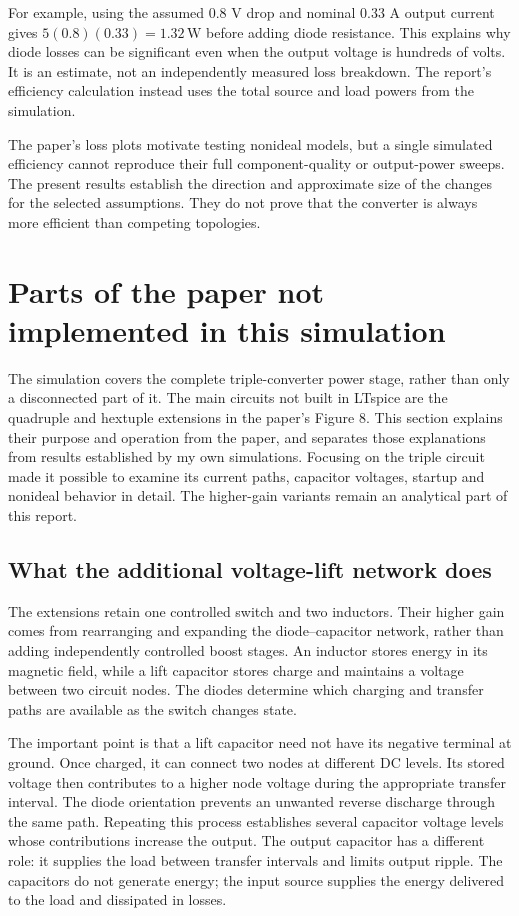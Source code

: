 \documentclass[11pt,a4paper]{article}
\newcommand{\unit}[1]{\,\mathrm{#1}}
\begin{document}
For example, using the assumed 0.8 V drop and nominal 0.33 A output current gives $5(0.8)(0.33)=1.32\unit{W}$ before adding diode resistance. This explains why diode losses can be significant even when the output voltage is hundreds of volts. It is an estimate, not an independently measured loss breakdown. The report's efficiency calculation instead uses the total source and load powers from the simulation.

The paper's loss plots motivate testing nonideal models, but a single simulated efficiency cannot reproduce their full component-quality or output-power sweeps. The present results establish the direction and approximate size of the changes for the selected assumptions. They do not prove that the converter is always more efficient than competing topologies.
\clearpage
\section{Parts of the paper not implemented in this simulation}
The simulation covers the complete triple-converter power stage, rather than only a disconnected part of it. The main circuits not built in LTspice are the quadruple and hextuple extensions in the paper's Figure 8. This section explains their purpose and operation from the paper, and separates those explanations from results established by my own simulations. Focusing on the triple circuit made it possible to examine its current paths, capacitor voltages, startup and nonideal behavior in detail. The higher-gain variants remain an analytical part of this report.

\subsection{What the additional voltage-lift network does}
The extensions retain one controlled switch and two inductors. Their higher gain comes from rearranging and expanding the diode--capacitor network, rather than adding independently controlled boost stages. An inductor stores energy in its magnetic field, while a lift capacitor stores charge and maintains a voltage between two circuit nodes. The diodes determine which charging and transfer paths are available as the switch changes state.

The important point is that a lift capacitor need not have its negative terminal at ground. Once charged, it can connect two nodes at different DC levels. Its stored voltage then contributes to a higher node voltage during the appropriate transfer interval. The diode orientation prevents an unwanted reverse discharge through the same path. Repeating this process establishes several capacitor voltage levels whose contributions increase the output. The output capacitor has a different role: it supplies the load between transfer intervals and limits output ripple. The capacitors do not generate energy; the input source supplies the energy delivered to the load and dissipated in losses.
\end{document}
